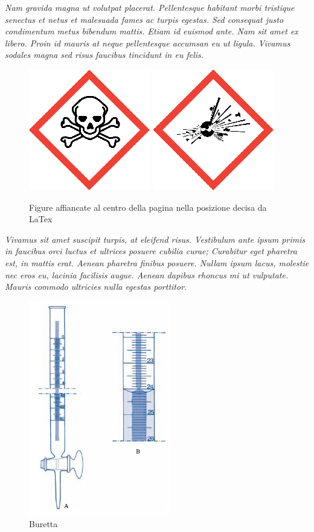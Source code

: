 \textit{Nam gravida magna ut volutpat placerat. Pellentesque habitant morbi tristique senectus et netus et malesuada fames ac turpis egestas. Sed consequat justo condimentum metus bibendum mattis. Etiam id euismod ante. Nam sit amet ex libero. Proin id mauris at neque pellentesque accumsan eu ut ligula. Vivamus sodales magna sed risus faucibus tincidunt in eu felis.}

\begin{figure}
    \centering
    \includegraphics[scale=0.2]{img/pittogrammi/Acute toxicity.png}
    \includegraphics[scale=0.2]{img/pittogrammi/Explosive.png}
    \caption{Figure affiancate al centro della pagina nella posizione decisa da LaTex}
    \label{fig:4}
\end{figure}

\textit{Vivamus sit amet suscipit turpis, at eleifend risus. Vestibulum ante ipsum primis in faucibus orci luctus et ultrices posuere cubilia curae; Curabitur eget pharetra est, in mattis erat. Aenean pharetra finibus posuere. Nullam ipsum lacus, molestie nec eros eu, lacinia facilisis augue. Aenean dapibus rhoncus mi ut vulputate. Mauris commodo ultricies nulla egestas porttitor.}

\begin{figure}[h]
    \centering
    \includegraphics{img/buretta.jpg}
    \caption{Buretta}
    \label{fig:5}
\end{figure}
